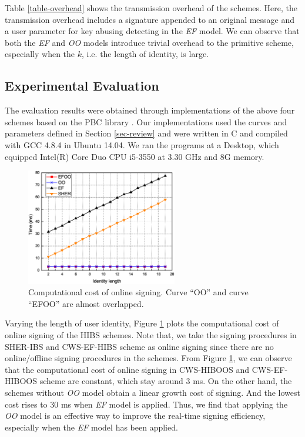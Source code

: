 \documentclass[letter]{ieice}
\begin{document}
Table \ref{table-overhead} shows the transmission overhead of the schemes.
Here, the transmission overhead includes a signature appended to an original message and a user parameter for key abusing detecting in the \emph{EF} model.
We can observe that both the \emph{EF} and \emph{OO} models introduce trivial overhead to the primitive scheme, especially when the $k$, i.e. the length of identity, is large.
\par

\subsection{Experimental Evaluation}
The evaluation results were obtained through implementations of the above four schemes based on the PBC library \cite{pbclib}.
Our implementations used the curves and parameters defined in Section \ref{sec-review} and were written in C and compiled with GCC 4.8.4 in Ubuntu 14.04. 
We ran the programs at a Desktop, which equipped Intel(R) Core Duo CPU i5-3550 at 3.30 GHz and 8G memory. 
\par

\begin{figure}[htbp]
\centering
\includegraphics[width=6.6cm]{on_sign.eps}
\caption{Computational cost of online signing. Curve ``OO'' and curve ``EFOO'' are almost overlapped.} \label{fig-on-sign}
\end{figure}

Varying the length of user identity, Figure \ref{fig-on-sign} plots the computational cost of online signing of the HIBS schemes.
Note that, we take the signing procedures in SHER-IBS and CWS-EF-HIBS scheme as online signing since there are no online/offline signing procedures in the schemes.
From Figure \ref{fig-on-sign}, we can observe that the computational cost of online signing in CWS-HIBOOS and CWS-EF-HIBOOS scheme are constant, which stay around 3 ms.
On the other hand, the schemes without \emph{OO} model obtain a linear growth cost of signing.
And the lowest cost rises to 30 ms when \emph{EF} model is applied.
Thus, we find that applying the \emph{OO} model is an effective way to improve the real-time signing efficiency, especially when the \emph{EF} model has been applied.
\end{document}
